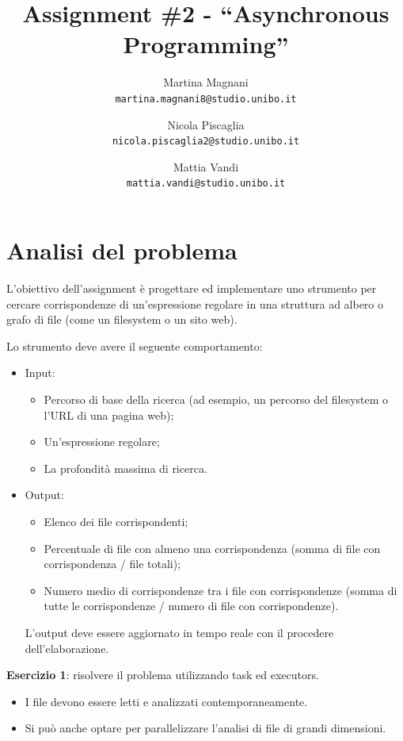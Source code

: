 ﻿\documentclass[a4paper]{article}
\title{\LARGE \bf
Assignment \#2 - ``Asynchronous Programming''
}
\author{
    Martina Magnani\\
    \texttt{martina.magnani8@studio.unibo.it}
    \and
    Nicola Piscaglia\\
    \texttt{nicola.piscaglia2@studio.unibo.it}
    \and
    Mattia Vandi\\
    \texttt{mattia.vandi@studio.unibo.it}
}
\date{}
\begin{document}
\maketitle

\section{Analisi del problema}\label{analisi-del-problema}

L'obiettivo dell'assignment è progettare ed implementare uno strumento per cercare corrispondenze di un'espressione regolare in una struttura ad albero o grafo di file (come un filesystem o un sito web).

Lo strumento deve avere il seguente comportamento:

\begin{itemize}
%
    \item Input\label{input}:
%
        \begin{itemize}
%
            \item Percorso di base della ricerca (ad esempio, un percorso del filesystem o l'URL di una pagina web);
%
            \item Un'espressione regolare;
%
            \item La profondit\`a massima di ricerca.
%
        \end{itemize}
%
    \item Output\label{output}:
%
        \begin{itemize}
%
            \item Elenco dei file corrispondenti;
%
            \item Percentuale di file con almeno una corrispondenza (somma di file con corrispondenza / file totali);
%
            \item Numero medio di corrispondenze tra i file con corrispondenze (somma di tutte le corrispondenze / numero di file con corrispondenze).
%
        \end{itemize}
%
        L'output deve essere aggiornato in tempo reale con il procedere dell'elaborazione.
%
\end{itemize}

\textbf{Esercizio 1}: risolvere il problema utilizzando task ed executors.

\begin{itemize}
%
    \item I file devono essere letti e analizzati contemporaneamente.
%
    \item Si pu\`o anche optare per parallelizzare l'analisi di file di grandi dimensioni.
%
\end{itemize}
\end{document}
